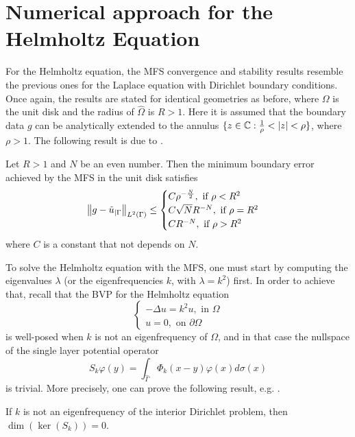 \section{Numerical approach for the Helmholtz Equation}
For the Helmholtz equation, the \ac{MFS} convergence and stability results resemble the previous ones for the Laplace equation with Dirichlet boundary conditions. Once again, the results are stated for identical geometries as before, where \(\Omega\) is the unit disk and the radius of \(\hat{\Omega}\) is \(R>1\). Here it is assumed that the boundary data \(g\) can be analytically extended to the annulus \(\{z \in \mathbb{C}: \frac{1}{\rho}< \abs{z} < \rho\}\), where \(\rho > 1\). The following result is due to \cite{barnett2008stability}.
\begin{theorem}
    Let \(R > 1\) and \(N\) be an even number. Then the minimum boundary error achieved by the \ac{MFS} in the unit disk satisfies
    \[
        \norm{g - \tilde{u}_{|\Gamma}}_{L^2(\Gamma)} \leq
        \begin{cases}
            C \rho^{-\frac{N}{2}}, \text{ if } \rho < R^2\\
            C \sqrt{N} R^{-N}, \text{ if } \rho = R^2\\
            C R^{-N}, \text{ if } \rho > R^2\\
        \end{cases}
    \]
    where \(C\) is a constant that not depends on \(N\).
\end{theorem}
To solve the Helmholtz equation with the \ac{MFS}, one must start by computing the eigenvalues \(\lambda\) (or the eigenfrequencies \(k\), with \(\lambda = k^2\)) first. In order to achieve that, recall that the \ac{BVP} for the Helmholtz equation
\begin{equation}\label{helm_dirichlet}
    \begin{cases}
        -\Delta u = k^2 u, \text{ in } \Omega\\
        u = 0, \text{ on } \partial \Omega
    \end{cases}
\end{equation}
is well-posed when \(k\) is not an eigenfrequency of \(\Omega\), and in that case the nullspace of the single layer potential operator
\[
    S_k \varphi(y) = \int_{\hat{\Gamma}} \Phi_k(x-y)\varphi(x) d\sigma(x)
\]
is trivial. More precisely, one can prove the following result, e.g. \cite{alves2005method}.
\begin{theorem}\label{MFS_helm_null_kern}
    If \(k\) is not an eigenfrequency of the interior Dirichlet problem, then \(\dim \left(\ker(S_k)\right)=0\).
\end{theorem}
